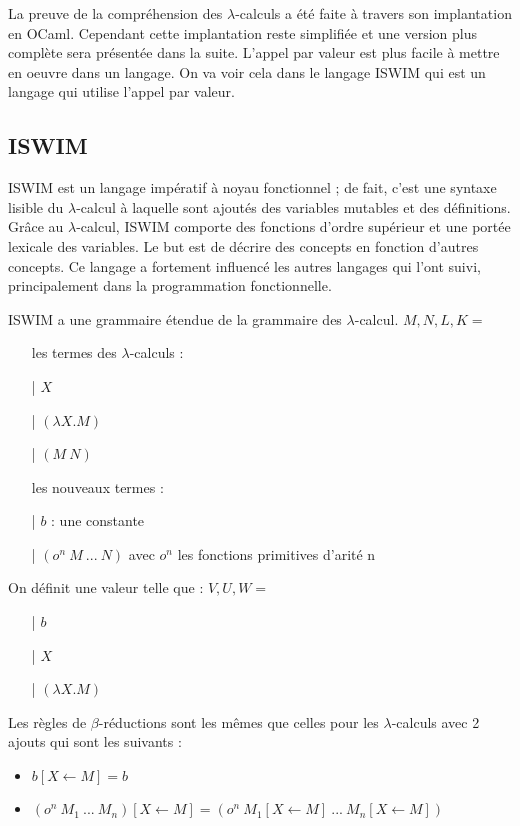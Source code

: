 \documentclass[10pt,a4paper]{report}
\begin{document}
La preuve de la compréhension des $\lambda$-calculs a été faite à travers son implantation en OCaml. Cependant cette implantation reste simplifiée et une version plus complète sera présentée dans la suite. 
\smallbreak
L'appel par valeur est plus facile à mettre en oeuvre dans un langage.
On va voir cela dans le langage ISWIM qui est un langage qui utilise l'appel par valeur.

\subsection{ISWIM}	

ISWIM est un langage impératif à noyau fonctionnel ; de fait, c'est une syntaxe lisible du $\lambda$-calcul à laquelle sont ajoutés des variables mutables et des définitions. Grâce au $\lambda$-calcul, ISWIM comporte des fonctions d'ordre supérieur et une portée lexicale des variables. Le but est de décrire des concepts en fonction d'autres concepts. Ce langage a fortement influencé les autres langages qui l'ont suivi, principalement dans la programmation fonctionnelle.
\medbreak

ISWIM a une grammaire étendue de la grammaire des $\lambda$-calcul.
\smallbreak
$M,N,L,K =$
\begin{itemize}
\item[ ] les termes des $\lambda$-calculs :
\item[|] $X$ 
\item[|] $(\lambda X.M)$
\item[|] $(M~N)$
\item[ ] les nouveaux termes :
\item[|] $b$ : une constante
\item[|] $(o^{n}~M~...~N)$ avec $o^{n}$ les fonctions primitives d'arité n
\end{itemize}
\medbreak

On définit une valeur telle que :
\smallbreak
$V,U,W =$
\begin{itemize}
\item[|] $b$
\item[|] $X$
\item[|] $(\lambda X.M)$
\end{itemize}
\bigbreak


Les règles de $\beta$-réductions sont les mêmes que celles pour les $\lambda$-calculs avec 2 ajouts qui sont les suivants :
\begin{itemize}
\item $b[X \longleftarrow M] = b$
\item $(o^{n}~M_{1}~...~M_{n})[X \longleftarrow M] = (o^{n}~M_{1}[X \longleftarrow M]~...~M_{n}[X \longleftarrow M])$
\end{itemize}
\bigbreak
\end{document}
